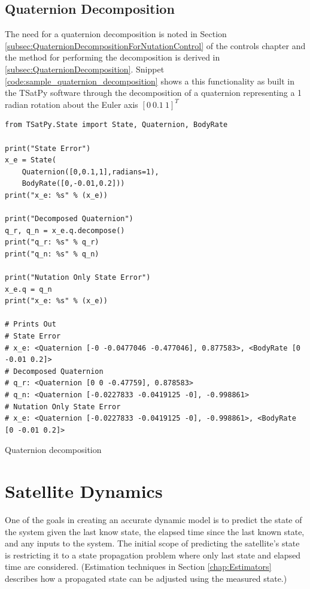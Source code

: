 \subsection{Quaternion Decomposition}
\label{subsec:TSatPyQuaternionDecomposition}

The need for a quaternion decomposition is noted in Section \ref{subsec:QuaternionDecompositionForNutationControl} of the controls chapter and the method for performing the decomposition is derived in \ref{subsec:QuaternionDecomposition}.  Snippet \ref{code:sample_quaternion_decomposition} shows a this functionality as built in the TSatPy software through the decomposition of a quaternion representing a 1 radian rotation about the Euler axis $[0 \ 0.1 \ 1]^T$

\begin{listing}[H]
\begin{singlespace}
  \begin{verbatim}
from TSatPy.State import State, Quaternion, BodyRate

print("State Error")
x_e = State(
    Quaternion([0,0.1,1],radians=1),
    BodyRate([0,-0.01,0.2]))
print("x_e: %s" % (x_e))

print("Decomposed Quaternion")
q_r, q_n = x_e.q.decompose()
print("q_r: %s" % q_r)
print("q_n: %s" % q_n)

print("Nutation Only State Error")
x_e.q = q_n
print("x_e: %s" % (x_e))

# Prints Out
# State Error
# x_e: <Quaternion [-0 -0.0477046 -0.477046], 0.877583>, <BodyRate [0 -0.01 0.2]>
# Decomposed Quaternion
# q_r: <Quaternion [0 0 -0.47759], 0.878583>
# q_n: <Quaternion [-0.0227833 -0.0419125 -0], -0.998861>
# Nutation Only State Error
# x_e: <Quaternion [-0.0227833 -0.0419125 -0], -0.998861>, <BodyRate [0 -0.01 0.2]>
  \end{verbatim}
\caption{Quaternion decomposition}
\label{code:sample_quaternion_decomposition}
\nocite{minted}
\end{singlespace}
\end{listing}




\section{Satellite Dynamics}
\label{sec:SatelliteDynamics}

One of the goals in creating an accurate dynamic model is to predict the state of the system given the last know state, the elapsed time since the last known state, and any inputs to the system.  The initial scope of predicting the satellite's state is restricting it to a state propagation problem where only last state and elapsed time are considered.  (Estimation techniques in Section \ref{chap:Estimators} describes how a propagated state can be adjusted using the measured state.)

